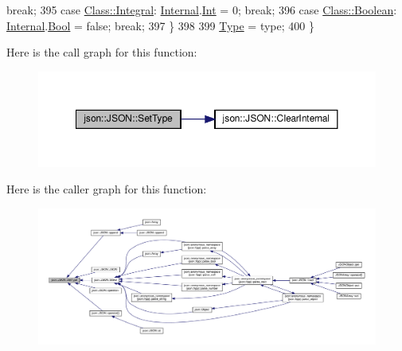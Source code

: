 \begin{DoxyCode}
{      break};
395             \textcolor{keywordflow}{case} \mbox{\hyperlink{classjson_1_1_j_s_o_n_a762f55df6d407c1af61607ed516ffe07a4ea94552a2bec56a29592359a1b6069e}{Class::Integral}}:  \mbox{\hyperlink{classjson_1_1_j_s_o_n_a1e2a064794c3d55c8bb8887fc5734947}{Internal}}.\mbox{\hyperlink{unionjson_1_1_j_s_o_n_1_1_backing_data_a0d80815a70ff5bb9345f75de79ec81c3}{Int}}    = 0;                      \textcolor{keywordflow}{
      break};
396             \textcolor{keywordflow}{case} \mbox{\hyperlink{classjson_1_1_j_s_o_n_a762f55df6d407c1af61607ed516ffe07a27226c864bac7454a8504f8edb15d95b}{Class::Boolean}}:   \mbox{\hyperlink{classjson_1_1_j_s_o_n_a1e2a064794c3d55c8bb8887fc5734947}{Internal}}.\mbox{\hyperlink{unionjson_1_1_j_s_o_n_1_1_backing_data_a0659fafaedb7de535ae3e79e4ff4688c}{Bool}}   = \textcolor{keyword}{false};                  \textcolor{keywordflow}{
      break};
397             \}
398 
399             \mbox{\hyperlink{classjson_1_1_j_s_o_n_a3fa6923afa41bdfe38077fbc0079aaf5}{Type}} = type;
400         \}
\end{DoxyCode}
Here is the call graph for this function\+:
\nopagebreak
\begin{figure}[H]
\begin{center}
\leavevmode
\includegraphics[width=350pt]{classjson_1_1_j_s_o_n_a668500208950e48394fc8bfe7c320205_cgraph}
\end{center}
\end{figure}
Here is the caller graph for this function\+:
\nopagebreak
\begin{figure}[H]
\begin{center}
\leavevmode
\includegraphics[width=350pt]{classjson_1_1_j_s_o_n_a668500208950e48394fc8bfe7c320205_icgraph}
\end{center}
\end{figure}
\mbox{\label{classjson_1_1_j_s_o_n_af8665d4f94afa84c3e20d52a7184f7ee}} 
